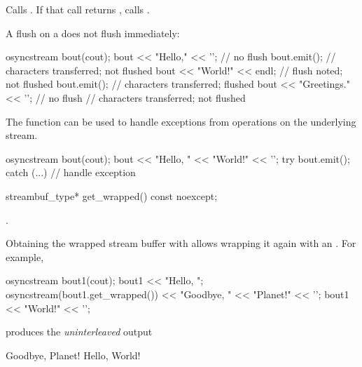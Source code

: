 \begin{itemdescr}
\pnum
\effects
Calls .
If that call returns ,
calls .

\pnum
\begin{example}
A flush on a  does not flush immediately:
\begin{codeblock}
{
  osyncstream bout(cout);
  bout << "Hello," << '\n';     // no flush
  bout.emit();                  // characters transferred;  not flushed
  bout << "World!" << endl;     // flush noted;  not flushed
  bout.emit();                  // characters transferred;  flushed
  bout << "Greetings." << '\n'; // no flush
}   // characters transferred;  not flushed
\end{codeblock}
\end{example}

\pnum
\begin{example}
The function  can be used to
handle exceptions from operations on the underlying stream.
\begin{codeblock}
{
  osyncstream bout(cout);
  bout << "Hello, " << "World!" << '\n';
  try {
    bout.emit();
  } catch (...) {
    // handle exception
  }
}
\end{codeblock}
\end{example}
\end{itemdescr}

%
\begin{itemdecl}
streambuf_type* get_wrapped() const noexcept;
\end{itemdecl}

\begin{itemdescr}
\pnum
\returns
{}.

\pnum
\begin{example}
Obtaining the wrapped stream buffer with 
allows wrapping it again with an .
For example,
\begin{codeblock}
{
  osyncstream bout1(cout);
  bout1 << "Hello, ";
  {
    osyncstream(bout1.get_wrapped()) << "Goodbye, " << "Planet!" << '\n';
  }
  bout1 << "World!" << '\n';
}
\end{codeblock}
produces the \textit{uninterleaved} output
\begin{outputblock}
Goodbye, Planet!
Hello, World!
\end{outputblock}
\end{example}
\end{itemdescr}

